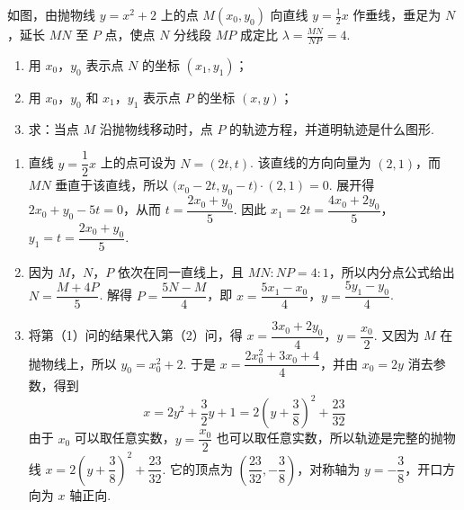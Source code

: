 \begin{problem}

如图，由抛物线 \(y=x^2+2\) 上的点 \(M(x_0,y_0)\) 向直线 \(y=\frac{1}{2}x\) 作垂线，垂足为 \(N\)，延长 \(MN\) 至 \(P\) 点，使点 \(N\) 分线段 \(MP\) 成定比 \(\lambda=\frac{MN}{NP}=4\).

\begin{enumerate}
\item 用 \(x_0\)，\(y_0\) 表示点 \(N\) 的坐标 \((x_1, y_1)\)；
\item 用 \(x_0\)，\(y_0\) 和 \(x_1\)，\(y_1\) 表示点 \(P\) 的坐标 \((x, y)\)；
\item 求：当点 \(M\) 沿抛物线移动时，点 \(P\) 的轨迹方程，并道明轨迹是什么图形.
\end{enumerate}

\begin{solution}
\begin{enumerate}
\item 直线 \(y=\dfrac12x\) 上的点可设为 \(N=(2t,t)\). 该直线的方向向量为 \((2,1)\)，而 \(MN\) 垂直于该直线，所以 \(\bigl(x_0-2t,y_0-t\bigr)\cdot(2,1)=0\). 展开得 \(2x_0+y_0-5t=0\)，从而 \(t=\dfrac{2x_0+y_0}{5}\). 因此 \(x_1=2t=\dfrac{4x_0+2y_0}{5}\)，\(y_1=t=\dfrac{2x_0+y_0}{5}\).
\item 因为 \(M\)，\(N\)，\(P\) 依次在同一直线上，且 \(MN:NP=4:1\)，所以内分点公式给出 \(N=\dfrac{M+4P}{5}\). 解得 \(P=\dfrac{5N-M}{4}\)，即 \(x=\dfrac{5x_1-x_0}{4}\)，\(y=\dfrac{5y_1-y_0}{4}\).
\item 将第（1）问的结果代入第（2）问，得 \(x=\dfrac{3x_0+2y_0}{4}\)，\(y=\dfrac{x_0}{2}\). 又因为 \(M\) 在抛物线上，所以 \(y_0=x_0^2+2\). 于是 \(x=\dfrac{2x_0^2+3x_0+4}{4}\)，并由 \(x_0=2y\) 消去参数，得到
\[
x=2y^2+\frac32y+1=2\left(y+\frac38\right)^2+\frac{23}{32}
\]
由于 \(x_0\) 可以取任意实数，\(y=\dfrac{x_0}{2}\) 也可以取任意实数，所以轨迹是完整的抛物线 \(x=2\left(y+\dfrac38\right)^2+\dfrac{23}{32}\). 它的顶点为 \(\left(\dfrac{23}{32},-\dfrac38\right)\)，对称轴为 \(y=-\dfrac38\)，开口方向为 \(x\) 轴正向.
\end{enumerate}
\end{solution}
\end{problem}
